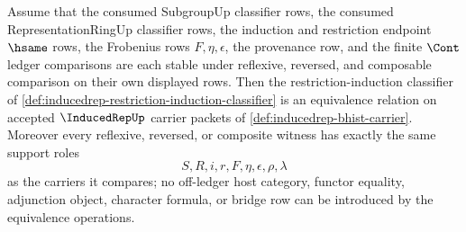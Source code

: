 \begin{theorem}
\label{thm:inducedrep-restriction-induction-classifier-equivalence}
Assume that the consumed SubgroupUp classifier rows, the consumed
RepresentationRingUp classifier rows, the induction and restriction endpoint
$\hsame$ rows, the Frobenius rows $F,\eta,\epsilon$, the provenance row, and
the finite $\Cont$ ledger comparisons are each stable under reflexive,
reversed, and composable comparison on their own displayed rows. Then the
restriction-induction classifier of
\autoref{def:inducedrep-restriction-induction-classifier} is an equivalence
relation on accepted $\InducedRepUp$ carrier packets of
\autoref{def:inducedrep-bhist-carrier}. Moreover every reflexive, reversed,
or composite witness has exactly the same support roles
$$
S,R,i,r,F,\eta,\epsilon,\rho,\lambda
$$
as the carriers it compares; no off-ledger host category, functor equality,
adjunction object, character formula, or bridge row can be introduced by the
equivalence operations.
\end{theorem}
